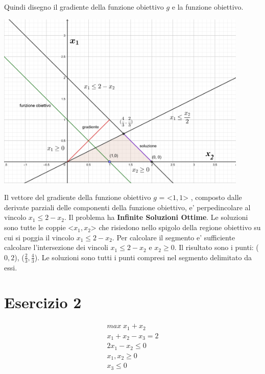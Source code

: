 \documentclass[a4paper,12pt,oneside]{article}
\begin{document}
    Quindi disegno il gradiente della funzione obiettivo $g$ e la funzione obiettivo.

    \begin{center}
        \includegraphics[width=12cm]{seconda-fase.png}
    \end{center}

    Il vettore del gradiente della funzione obiettivo $g$ = <$1, 1$> , composto dalle derivate parziali delle componenti della funzione obiettivo, e' perpedincolare al vincolo $x_1 \leq 2 - x_2$.
    Il problema ha \textbf{Infinite Soluzioni Ottime}.
    Le soluzioni sono tutte le coppie <$x_1, x_2$> che risiedono nello spigolo della regione obiettivo su cui si poggia il vincolo $x_1 \leq 2 - x_2$.
    Per calcolare il segmento e' sufficiente calcolare l'intersezione dei vincoli $x_1 \leq 2 - x_2$ e $x_2 \geq 0$.
    Il risultato sono i punti: ($0, 2$),  ($\frac 2 3, \frac 4 3$). Le soluzioni sono tutti i punti compresi nel segmento delimitato da essi.

    \newpage

    \section{Esercizio 2}

    \begin{align}
        \text{$max \; x_1 + x_2$} \\
        \text{$x_1 + x_2 - x_3 = 2$} \\
        \text{$2 x_1 - x_2 \leq 0$} \\
        \text{$x_1, x_2 \geq 0$} \\
        \text{$x_3 \leq 0$}
    \end{align}
\end{document}
